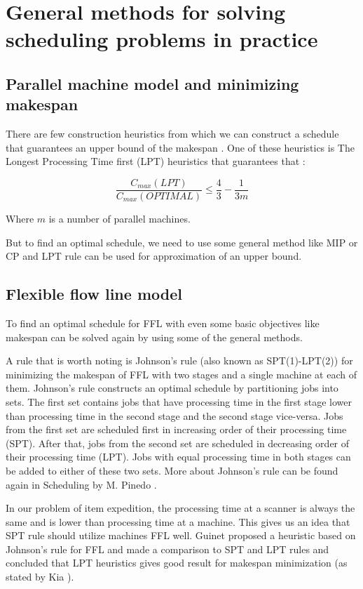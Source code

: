 \documentclass{ctuthesis}
\begin{document}
\section{General methods for solving scheduling problems in practice}

\subsection{Parallel machine model and minimizing makespan}

There are few construction heuristics from which we can construct a schedule that guarantees an upper bound of the makespan \cite{gram}. One of these heuristics is The Longest Processing Time first (LPT) heuristics \cite{pinedo} that guarantees that \cite{gram1969}:

\begin{equation}
\dfrac{C_{max}(LPT)}{C_{max}(OPTIMAL)} \leq \dfrac{4}{3} - \dfrac{1}{3m}
\end{equation}

Where $m$ is a number of parallel machines.

But to find an optimal schedule, we need to use some general method like MIP or CP and LPT rule can be used for approximation of an upper bound.

\subsection{Flexible flow line model}
\label{subsec:ffl}
To find an optimal schedule for FFL with even some basic objectives like makespan can be solved again by using some of the general methods. 

A rule that is worth noting is Johnson's rule (also known as SPT(1)-LPT(2)) for minimizing the makespan of FFL with two stages and a single machine at each of them. Johnson's rule constructs an optimal schedule by partitioning jobs into sets. The first set contains jobs that have processing time in the first stage lower than processing time in the second stage and the second stage vice-versa. Jobs from the first set are scheduled first in increasing order of their processing time (SPT). After that, jobs from the second set are scheduled in decreasing order of their processing time (LPT). Jobs with equal processing time in both stages can be added to either of these two sets. More about Johnson's rule can be found again in Scheduling by M. Pinedo \cite{pinedo}.

In our problem of item expedition, the processing time at a scanner is always the same and is lower than processing time at a machine. This gives us an idea that SPT rule should utilize machines FFL well. Guinet \cite{guinet} proposed a heuristic based on Johnson's rule for FFL and made a comparison to SPT and LPT rules and concluded that LPT heuristics gives good result for makespan minimization (as stated by Kia \cite{kia}).
\end{document}
